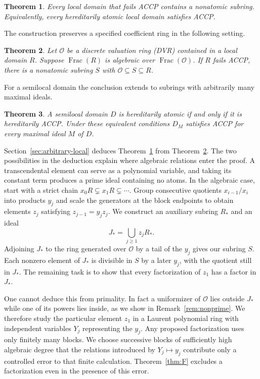 \documentclass[11pt, letterpaper]{article}
\newtheorem{maintheorem}{Theorem}
\theoremstyle{definition}
\theoremstyle{remark}
\DeclareMathOperator{\Frac}{Frac}
\begin{document}
\begin{maintheorem}
    \label{thm:local}
    Every local domain that fails ACCP contains a nonatomic subring.
    Equivalently, every hereditarily atomic local domain satisfies ACCP.
\end{maintheorem}

The construction preserves a specified coefficient ring in the following setting.

\begin{maintheorem}
    \label{thm:dvr}
    Let $\mathcal{O}$ be a discrete valuation ring (DVR) contained in a local domain $R$.
    Suppose $\Frac(R)$ is algebraic over $\Frac(\mathcal{O})$.
    If $R$ fails ACCP, there is a nonatomic subring $S$ with $\mathcal{O} \subseteq S \subseteq R$.
\end{maintheorem}

For a semilocal domain the conclusion extends to subrings with arbitrarily many maximal ideals.

\begin{maintheorem}
    \label{thm:hereditary}
    A semilocal domain $D$ is hereditarily atomic if and only if it is hereditarily ACCP.
    Under these equivalent conditions $D_M$ satisfies ACCP for every maximal ideal $M$ of $D$.
\end{maintheorem}

Section~\ref{sec:arbitrary-local} deduces Theorem~\ref{thm:local} from Theorem~\ref{thm:dvr}.
The two possibilities in the deduction explain where algebraic relations enter the proof.
A transcendental element can serve as a polynomial variable, and taking its constant term produces a prime ideal containing no atoms.
In the algebraic case, start with a strict chain $x_{0}R \subsetneq x_{1}R \subsetneq \cdots$.
Group consecutive quotients $x_{i - 1}/x_i$ into products $y_j$ and scale the generators at the block endpoints to obtain elements $z_j$ satisfying $z_{j - 1} = y_j z_j$.
We construct an auxiliary subring $R_{*}$ and an ideal
\[
    J_{*} = \bigcup_{j \ge 1} z_j R_{*}.
\]
Adjoining $J_{*}$ to the ring generated over $\mathcal{O}$ by a tail of the $y_j$ gives our subring $S$.
Each nonzero element of $J_{*}$ is divisible in $S$ by a later $y_j$, with the quotient still in $J_{*}$.
The remaining task is to show that every factorization of $z_1$ has a factor in $J_{*}$.

One cannot deduce this from primality.
In fact a uniformizer of $\mathcal{O}$ lies outside $J_{*}$ while one of its powers lies inside, as we show in Remark~\ref{rem:nonprime}.
We therefore study the particular element $z_1$ in a Laurent polynomial ring with independent variables $Y_j$ representing the $y_j$.
Any proposed factorization uses only finitely many blocks.
We choose successive blocks of sufficiently high algebraic degree that the relations introduced by $Y_j \mapsto y_j$ contribute only a controlled error to that finite calculation.
Theorem~\ref{thm:F} excludes a factorization even in the presence of this error.
\end{document}
